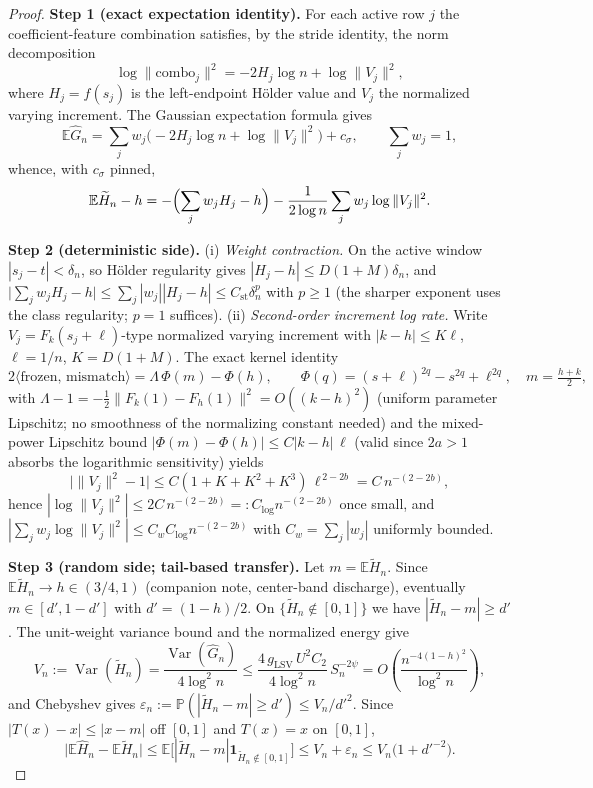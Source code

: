 \documentclass[11pt]{article}
\theoremstyle{definition}
\theoremstyle{remark}
\begin{document}
\begin{proof}
\textbf{Step 1 (exact expectation identity).} For each active row $j$ the
coefficient-feature combination satisfies, by the stride identity, the
norm decomposition
\[
\log\|\text{combo}_j\|^2=-2H_j\log n+\log\|V_j\|^2,
\]
where $H_j=f(s_j)$ is the left-endpoint H\"older value and $V_j$ the
normalized varying increment. The Gaussian expectation formula gives
\[
\mathbb E\widehat G_n=\sum_j w_j\bigl(-2H_j\log n+\log\|V_j\|^2\bigr)+c_\sigma,
\qquad \sum_j w_j=1,
\]
whence, with $c_\sigma$ pinned,
\begin{equation}
\mathbb E\widetilde H_n-h
= -\Bigl(\sum_j w_jH_j-h\Bigr)-\frac{1}{2\log n}\sum_j w_j\log\|V_j\|^2 .
\label{eq:decomp}
\end{equation}

\textbf{Step 2 (deterministic side).}
(i) \emph{Weight contraction.} On the active window $|s_j-t|<\delta_n$, so
H\"older regularity gives $|H_j-h|\le D(1+M)\delta_n$, and
$\bigl|\sum_jw_jH_j-h\bigr|\le\sum_j|w_j||H_j-h|\le C_{\mathrm{st}}\delta_n^{p}$
with $p\ge1$ (the sharper exponent uses the class regularity; $p=1$ suffices).
(ii) \emph{Second-order increment log rate.} Write $V_j=F_{k}(s_j+\ell)
$-type normalized varying increment with $|k-h|\le K\ell$, $\ell=1/n$,
$K=D(1+M)$. The exact kernel identity
\[
2\langle \text{frozen},\,\text{mismatch}\rangle
=\Lambda\,\Phi(m)-\Phi(h),\qquad
\Phi(q)=(s+\ell)^{2q}-s^{2q}+\ell^{2q},\quad m=\tfrac{h+k}{2},
\]
with $\Lambda-1=-\tfrac12\|F_k(1)-F_h(1)\|^2=O((k-h)^2)$ (uniform parameter
Lipschitz; no smoothness of the normalizing constant needed) and the
mixed-power Lipschitz bound $|\Phi(m)-\Phi(h)|\le C|k-h|\,\ell$ (valid since
$2a>1$ absorbs the logarithmic sensitivity) yields
\[
\bigl|\|V_j\|^2-1\bigr|\le C(1+K+K^2+K^3)\,\ell^{\,2-2b}
=C\,n^{-(2-2b)},
\]
hence $|\log\|V_j\|^2|\le 2C\,n^{-(2-2b)}=:C_{\log}n^{-(2-2b)}$ once small,
and $|\sum_jw_j\log\|V_j\|^2|\le C_wC_{\log}n^{-(2-2b)}$
with $C_w=\sum_j|w_j|$ uniformly bounded.

\textbf{Step 3 (random side; tail-based transfer).} Let
$m=\mathbb E\widetilde H_n$. Since $\mathbb E\widetilde H_n\to h\in(3/4,1)$
(companion note, center-band discharge), eventually
$m\in[d',1-d']$ with $d'=(1-h)/2$. On $\{\widetilde H_n\notin[0,1]\}$ we have
$|\widetilde H_n-m|\ge d'$. The unit-weight variance bound and the normalized
energy give
\[
V_n:=\operatorname{Var}(\widetilde H_n)
=\frac{\operatorname{Var}(\widehat G_n)}{4\log^2n}
\le\frac{4\,g_{\mathrm{LSV}}\,U^2C_2}{4\log^2n}\,S_n^{-2\psi}
=O\!\left(\frac{n^{-4(1-h)^2}}{\log^2n}\right),
\]
and Chebyshev gives $\varepsilon_n:=\mathbb P(|\widetilde H_n-m|\ge d')\le
V_n/d'^2$. Since $|T(x)-x|\le|x-m|$ off $[0,1]$ and $T(x)=x$ on $[0,1]$,
\[
\bigl|\mathbb E\widehat H_n-\mathbb E\widetilde H_n\bigr|
\le\mathbb E\bigl[|\widetilde H_n-m|\mathbf 1_{\widetilde H_n\notin[0,1]}\bigr]
\le V_n+\varepsilon_n \le V_n\bigl(1+d'^{-2}\bigr).
\]


\end{proof}
\end{document}
